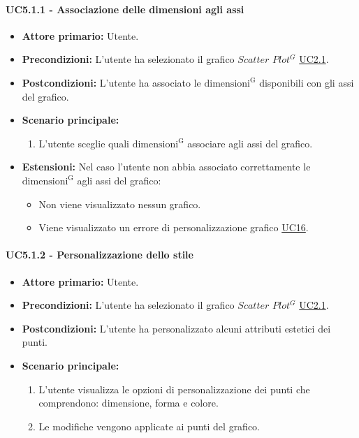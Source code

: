 \paragraph{UC5.1.1 - Associazione delle dimensioni agli assi}
\label{sec:UC5.1.1}
    \begin{itemize}
        \item \textbf{Attore primario:} Utente.
        \item \textbf{Precondizioni:} L'utente ha selezionato il grafico $Scatter$ $Plot^{G}$ \hyperref[sec:UC2.1]{UC2.1}.
	    \item \textbf{Postcondizioni:} L'utente ha associato le ${\mathrm{dimensioni^{G}}}$ disponibili con gli assi del grafico.
	    \item \textbf{Scenario principale:} 
	    \begin{enumerate}
	    		\item L'utente sceglie quali ${\mathrm{dimensioni^{G}}}$ associare agli assi del grafico.
		\end{enumerate}
	    \item \textbf{Estensioni:} Nel caso l'utente non abbia associato correttamente le ${\mathrm{dimensioni^{G}}}$ agli assi del grafico:
              \begin{itemize}
                  \item Non viene visualizzato nessun grafico.
                  \item Viene visualizzato un errore di personalizzazione grafico \hyperref[sec:UC16 - Errore di personalizzazione]{UC16}.
              \end{itemize}
    \end{itemize}
\paragraph{UC5.1.2 - Personalizzazione dello stile}
\label{sec:UC5.1.2}
    \begin{itemize}
        \item \textbf{Attore primario:} Utente.
        \item \textbf{Precondizioni:} L'utente ha selezionato il grafico $Scatter$ $Plot^{G}$ \hyperref[sec:UC2.1]{UC2.1}.
	    \item \textbf{Postcondizioni:} L'utente ha personalizzato alcuni attributi estetici dei punti.
	    \item \textbf{Scenario principale:} 
	    \begin{enumerate}
	    		\item L'utente visualizza le opzioni di personalizzazione dei punti che comprendono: dimensione, forma e colore.
	    		\item Le modifiche vengono applicate ai punti del grafico.
		\end{enumerate}
    \end{itemize}

